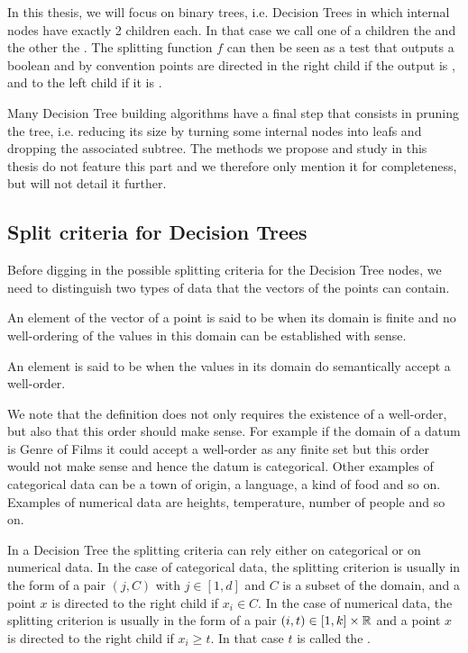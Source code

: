 In this thesis, we will focus on binary trees, i.e. Decision Trees in which internal nodes have exactly 2 children each. In that case we call one of a children the  and the other the . The splitting function $f$ can then be seen as a test that outputs a boolean and by convention points are directed in the right child if the output is \codetrue, and to the left child if it is \codefalse.

Many Decision Tree building algorithms have a final step that consists in pruning the tree, i.e. reducing its size by turning some internal nodes into leafs and dropping the associated subtree. The methods we propose and study in this thesis do not feature this part and we therefore only mention it for completeness, but will not detail it further.

\subsection{Split criteria for Decision Trees} \label{subsec:intro_dt_split_criteria}
Before digging in the possible splitting criteria for the Decision Tree nodes, we need to distinguish two types of data that the vectors of the points can contain.
\begin{definition}
    An element of the vector of a point is said to be  when its domain is finite and no well-ordering of the values in this domain can be established with sense.

    An element is said to be  when the values in its domain do semantically accept a well-order.
\end{definition}

We note that the definition does not only requires the existence of a well-order, but also that this order should make sense. For example if the domain of a datum is Genre of Films it could accept a well-order as any finite set but this order would not make sense and hence the datum is categorical. Other examples of categorical data can be a town of origin, a language, a kind of food and so on. Examples of numerical data are heights, temperature, number of people and so on.

In a Decision Tree the splitting criteria can rely either on categorical or on numerical data. In the case of categorical data, the splitting criterion is usually in the form of a pair $(j, C)$ with $j\in [1, d]$ and $C$ is a subset of the domain, and a point $x$ is directed to the right child if $x_i \in C$. In the case of numerical data, the splitting criterion is usually in the form of a pair $(i, t) \in [1, k]\times \mathbb{R}$ and a point $x$ is directed to the right child if $x_i \geq t$. In that case $t$ is called the .

